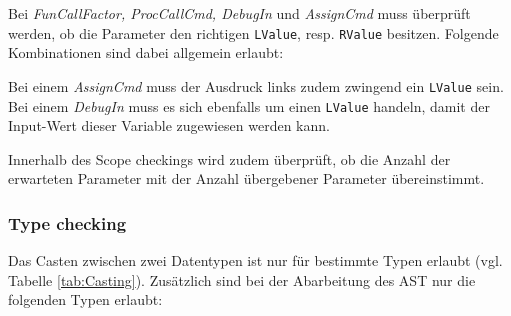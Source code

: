 \documentclass[10pt, a4paper, twocolumn]{article} %
\begin{document}
Bei \textit{FunCallFactor, ProcCallCmd, DebugIn} und \textit{AssignCmd} muss überprüft werden, ob die Parameter den richtigen \texttt{LValue}, resp. \texttt{RValue} besitzen.
Folgende Kombinationen sind dabei allgemein erlaubt:

\begin{table}[h]
    \centering
    \tiny
    \caption{LRValue-Kombinationen}
    \label{tab:lrvalues}
\end{table}
Bei einem \textit{AssignCmd} muss der Ausdruck links zudem zwingend ein \texttt{LValue} sein.
Bei einem \textit{DebugIn} muss es sich ebenfalls um einen \texttt{LValue} handeln, damit der Input-Wert dieser Variable zugewiesen werden kann.

Innerhalb des Scope checkings wird zudem überprüft, ob die Anzahl der erwarteten Parameter mit der Anzahl übergebener Parameter übereinstimmt.

\subsubsection*{Type checking}
Das Casten zwischen zwei Datentypen ist nur für bestimmte Typen erlaubt (vgl. Tabelle \ref{tab:Casting}).
Zusätzlich sind bei der Abarbeitung des AST nur die folgenden Typen erlaubt:
\end{document}
